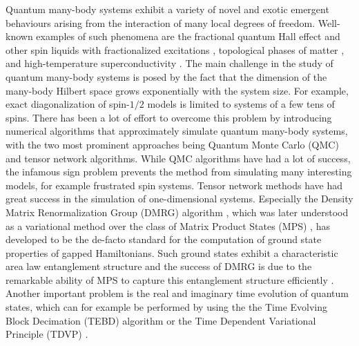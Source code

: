 Quantum many-body systems exhibit a variety of novel and exotic emergent behaviours arising from the interaction of many local degrees of freedom. Well-known examples of such phenomena are the fractional quantum Hall effect \cite{cite:two_dimensional_magnetotransport_in_the_extreme_quantum_limit, cite:anomalous_quantum_hall_effect_an_incompressible_quantum_fluid_with_fractionally_charged_excitations, cite:the_fractional_QHE} and other spin liquids with fractionalized excitations \cite{cite:fractionalized_excitations_in_the_spin_liquid_state_of_a_kagome_lattice_AFM}, topological phases of matter \cite{cite:colloqium_zoo_of_quantum_topological_phases_of_matter}, and high-temperature superconductivity \cite{cite:possible_high_T_c_superconductivity_in_the_Ba_La_Cu_O_system, cite:doping_a_mott_insulator_physics_of_high_temperature_superconductivity}. The main challenge in the study of quantum many-body systems is posed by the fact that the dimension of the many-body Hilbert space grows exponentially with the system size. For example, exact diagonalization of spin-$1/2$ models is limited to systems of a few tens of spins. There has been a lot of effort to overcome this problem by introducing numerical algorithms that approximately simulate quantum many-body systems, with the two most prominent approaches being Quantum Monte Carlo (QMC) \cite{cite:quantum_monte_carlo_simulation_method_for_spin_systems, cite:computational_studies_of_quantum_spin_systems} and tensor network algorithms. While QMC algorithms have had a lot of success, the infamous sign problem \cite{cite:computational_studies_of_quantum_spin_systems, cite:sign_problem_in_numerical_simulation_of_many_electron_systems} prevents the method from simulating many interesting models, for example frustrated spin systems. Tensor network methods have had great success in the simulation of one-dimensional systems. Especially the Density Matrix Renormalization Group (DMRG) algorithm \cite{cite:density_matrix_formulation_for_quantum_renormalization_groups}, which was later understood as a variational method over the class of Matrix Product States (MPS) \cite{cite:equivalence_of_the_variational_mps_and_the_dmrg_applied_to_spin_chains, cite:DMRG_in_the_age_of_MPS, cite:practical_introduction_MPS_and_PEPS}, has developed to be the de-facto standard for the computation of ground state properties of gapped Hamiltonians. Such ground states exhibit a characteristic area law entanglement structure \cite{cite:area_law_1D_proof} and the success of DMRG is due to the remarkable ability of MPS to capture this entanglement structure efficiently \cite{cite:area_laws_review, cite:mps_represent_ground_states_faithfully}. Another important problem is the real and imaginary time evolution of quantum states, which can for example be performed by using the the Time Evolving Block Decimation (TEBD) \cite{cite:efficient_simulation_of_1D_quantum_many_body_systems} algorithm or the Time Dependent Variational Principle (TDVP) \cite{cite:time_dependent_variational_principle_for_quantum_lattices}.
